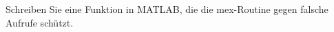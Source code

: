 \begin{aufg}
 Schreiben Sie eine Funktion in MATLAB, die die 
  mex-Routine  gegen falsche Aufrufe sch\"utzt. 
\end{aufg}